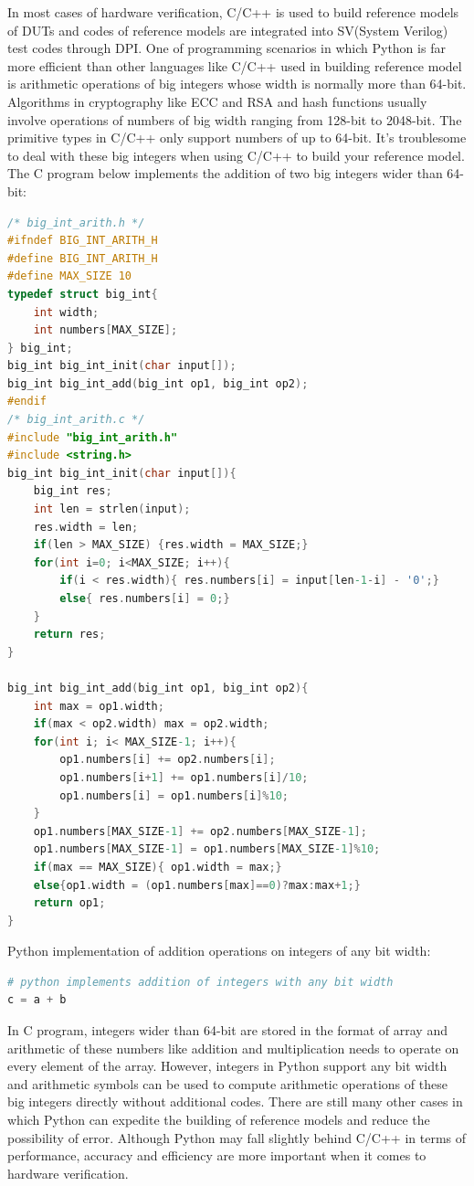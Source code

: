 \documentclass{article}
\begin{document}
In most cases of hardware verification, C/C++ is used to build reference models of DUTs and codes of reference models are integrated into SV(System Verilog) test codes through DPI. One of programming scenarios in which Python is far more efficient than other languages like C/C++ used in building reference model is arithmetic operations of big integers whose width is normally more than 64-bit. Algorithms in cryptography like ECC and RSA and hash functions usually involve operations of numbers of big width ranging from 128-bit to 2048-bit. The primitive types in C/C++ only support numbers of up to 64-bit. It's troublesome to deal with these big integers when using C/C++ to build your reference model. The C program below implements the addition of two big integers wider than 64-bit:
\begin{lstlisting}[language=C]
/* big_int_arith.h */
#ifndef BIG_INT_ARITH_H
#define BIG_INT_ARITH_H
#define MAX_SIZE 10
typedef struct big_int{
    int width;
    int numbers[MAX_SIZE];
} big_int;
big_int big_int_init(char input[]);
big_int big_int_add(big_int op1, big_int op2);
#endif
/* big_int_arith.c */
#include "big_int_arith.h"
#include <string.h>
big_int big_int_init(char input[]){
    big_int res;
    int len = strlen(input);
    res.width = len;
    if(len > MAX_SIZE) {res.width = MAX_SIZE;}
    for(int i=0; i<MAX_SIZE; i++){
        if(i < res.width){ res.numbers[i] = input[len-1-i] - '0';}
        else{ res.numbers[i] = 0;}
    }
    return res;
}

big_int big_int_add(big_int op1, big_int op2){
    int max = op1.width;
    if(max < op2.width) max = op2.width;
    for(int i; i< MAX_SIZE-1; i++){
        op1.numbers[i] += op2.numbers[i];
        op1.numbers[i+1] += op1.numbers[i]/10;
        op1.numbers[i] = op1.numbers[i]%10; 
    }
    op1.numbers[MAX_SIZE-1] += op2.numbers[MAX_SIZE-1];
    op1.numbers[MAX_SIZE-1] = op1.numbers[MAX_SIZE-1]%10;
    if(max == MAX_SIZE){ op1.width = max;}
    else{op1.width = (op1.numbers[max]==0)?max:max+1;}
    return op1;
}
\end{lstlisting}

Python implementation of addition operations on integers of any bit width:

\begin{lstlisting}[language=python]
# python implements addition of integers with any bit width
c = a + b
\end{lstlisting}

In C program, integers wider than 64-bit are stored in the format of array and arithmetic of these numbers like addition and multiplication needs to operate on every element of the array. However, integers in Python support any bit width and arithmetic symbols can be used to compute arithmetic operations of these big integers directly without additional codes. There are still many other cases in which Python can expedite the building of reference models and reduce the possibility of error. Although Python may fall slightly behind C/C++ in terms of performance, accuracy and efficiency are more important when it comes to hardware verification.
\end{document}
